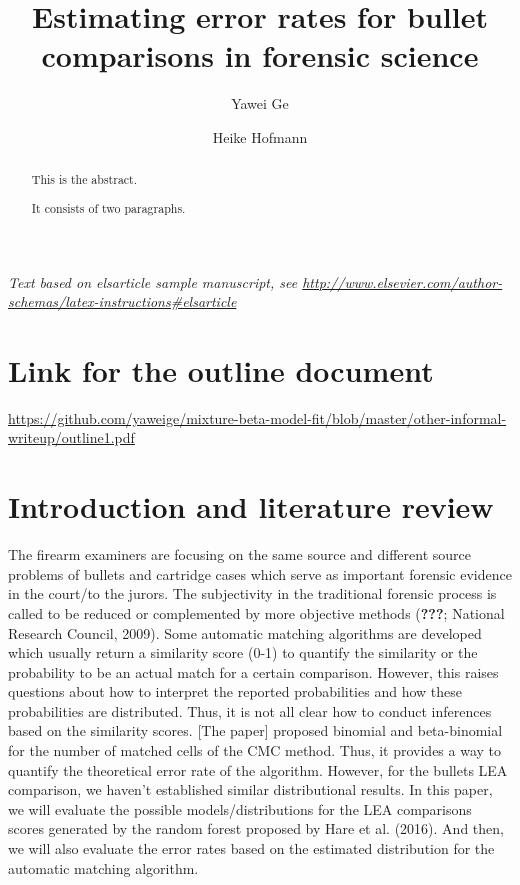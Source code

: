 \documentclass[]{elsarticle} %
\begin{document}
\begin{frontmatter}

  \title{Estimating error rates for bullet comparisons in forensic science}
    \author[Iowa State University]{Yawei Ge}
    \author[Iowa State University]{Heike Hofmann}
      \address[Some Institute of Technology]{Department, Street, City, State, Zip}
    \address[Another University]{Department, Street, City, State, Zip}
    
  \begin{abstract}
  This is the abstract.
  
  It consists of two paragraphs.
  \end{abstract}
  
 \end{frontmatter}

\newcommand{\hh}[1]{{\textcolor{orange}{#1}}}
\newcommand{\yg}[1]{{\textcolor{blue}{#1}}}

\emph{Text based on elsarticle sample manuscript, see
\url{http://www.elsevier.com/author-schemas/latex-instructions\#elsarticle}}

\hypertarget{link-for-the-outline-document}{%
\section{Link for the outline
document}\label{link-for-the-outline-document}}

\url{https://github.com/yaweige/mixture-beta-model-fit/blob/master/other-informal-writeup/outline1.pdf}

\hypertarget{introduction-and-literature-review}{%
\section{Introduction and literature
review}\label{introduction-and-literature-review}}

The firearm examiners are focusing on the same source and different
source problems of bullets and cartridge cases which serve as important
forensic evidence in the court/to the jurors. The subjectivity in the
traditional forensic process is called to be reduced or complemented by
more objective methods ({\textbf{???}}; National Research Council,
2009). Some automatic matching algorithms are developed which usually
return a similarity score (0-1) to quantify the similarity or the
probability to be an actual match for a certain comparison. However,
this raises questions about how to interpret the reported probabilities
and how these probabilities are distributed. Thus, it is not all clear
how to conduct inferences based on the similarity scores. {[}The
paper{]} proposed binomial and beta-binomial for the number of matched
cells of the CMC method. Thus, it provides a way to quantify the
theoretical error rate of the algorithm. However, for the bullets LEA
comparison, we haven't established similar distributional results. In
this paper, we will evaluate the possible models/distributions for the
LEA comparisons scores generated by the random forest proposed by Hare
et al. (2016). And then, we will also evaluate the error rates based on
the estimated distribution for the automatic matching algorithm.
\end{document}
